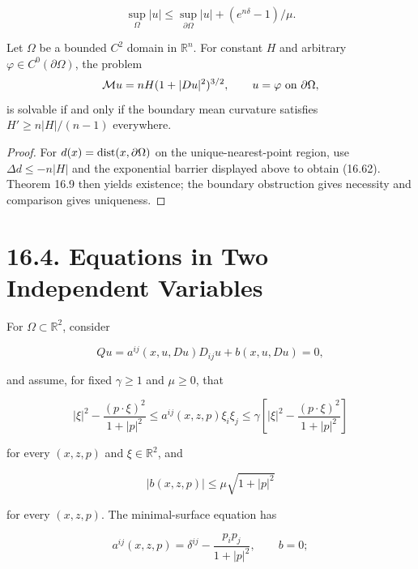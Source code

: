 \begin{equation}
\sup_\Omega|u|\le\sup_{\partial\Omega}|u|+(e^{n\delta}-1)/\mu.
\tag{16.62}
\end{equation}

\begin{theorem}\label{gilbarg-trudinger.thm.16.11.constant-mean-curvature-dirichlet}
Let $\Omega$ be a bounded $C^2$ domain in $\mathbb{R}^n$. For constant $H$ and arbitrary $\varphi\in C^0(\partial\Omega)$, the problem
\[
\mathcal{M} u=nH(1+|Du|^2)^{3/2},\qquad u=\varphi \text{ on } \partial\Omega,
\]
is solvable if and only if the boundary mean curvature satisfies $H'\ge n|H|/(n-1)$ everywhere.
\end{theorem}
\begin{proof}
\sketch For $d(x)=\operatorname{dist}(x,\partial\Omega)$ on the unique-nearest-point region, use $\Delta d\leq-n|H|$ and the exponential barrier displayed above to obtain (16.62). Theorem 16.9 then yields existence; the boundary obstruction gives necessity and comparison gives uniqueness.
\end{proof}

\section*{16.4. Equations in Two Independent Variables}

For $\Omega\subset\mathbb R^2$, consider

\begin{equation}\tag{16.63}
Qu=a^{ij}(x,u,Du)D_{ij}u+b(x,u,Du)=0,
\end{equation}

and assume, for fixed $\gamma\ge1$ and $\mu\ge0$, that

\begin{equation}\tag{16.64}
|\xi|^2-\frac{(p\cdot\xi)^2}{1+|p|^2}\le a^{ij}(x,z,p)\xi_i\xi_j\le \gamma\left[|\xi|^2-\frac{(p\cdot\xi)^2}{1+|p|^2}\right]
\end{equation}

for every $(x,z,p)$ and $\xi\in\mathbb R^2$, and

\begin{equation}\tag{16.65}
|b(x,z,p)|\le \mu\sqrt{1+|p|^2}
\end{equation}

for every $(x,z,p)$.  The minimal-surface equation has

\begin{equation*}
a^{ij}(x,z,p)=\delta^{ij}-\frac{p_ip_j}{1+|p|^2},\qquad b=0;
\end{equation*}


